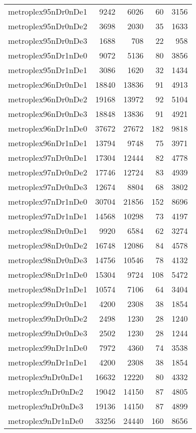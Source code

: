\begin{tabular}{lrrrr}
metroplex95nDr0nDe1 & 9242 & 6026 & 60 & 3156 \\
metroplex95nDr0nDe2 & 3698 & 2030 & 35 & 1633 \\
metroplex95nDr0nDe3 & 1688 & 708 & 22 & 958 \\
metroplex95nDr1nDe0 & 9072 & 5136 & 80 & 3856 \\
metroplex95nDr1nDe1 & 3086 & 1620 & 32 & 1434 \\
metroplex96nDr0nDe1 & 18840 & 13836 & 91 & 4913 \\
metroplex96nDr0nDe2 & 19168 & 13972 & 92 & 5104 \\
metroplex96nDr0nDe3 & 18848 & 13836 & 91 & 4921 \\
metroplex96nDr1nDe0 & 37672 & 27672 & 182 & 9818 \\
metroplex96nDr1nDe1 & 13794 & 9748 & 75 & 3971 \\
metroplex97nDr0nDe1 & 17304 & 12444 & 82 & 4778 \\
metroplex97nDr0nDe2 & 17746 & 12724 & 83 & 4939 \\
metroplex97nDr0nDe3 & 12674 & 8804 & 68 & 3802 \\
metroplex97nDr1nDe0 & 30704 & 21856 & 152 & 8696 \\
metroplex97nDr1nDe1 & 14568 & 10298 & 73 & 4197 \\
metroplex98nDr0nDe1 & 9920 & 6584 & 62 & 3274 \\
metroplex98nDr0nDe2 & 16748 & 12086 & 84 & 4578 \\
metroplex98nDr0nDe3 & 14756 & 10546 & 78 & 4132 \\
metroplex98nDr1nDe0 & 15304 & 9724 & 108 & 5472 \\
metroplex98nDr1nDe1 & 10574 & 7106 & 64 & 3404 \\
metroplex99nDr0nDe1 & 4200 & 2308 & 38 & 1854 \\
metroplex99nDr0nDe2 & 2498 & 1230 & 28 & 1240 \\
metroplex99nDr0nDe3 & 2502 & 1230 & 28 & 1244 \\
metroplex99nDr1nDe0 & 7972 & 4360 & 74 & 3538 \\
metroplex99nDr1nDe1 & 4200 & 2308 & 38 & 1854 \\
metroplex9nDr0nDe1 & 16632 & 12220 & 80 & 4332 \\
metroplex9nDr0nDe2 & 19042 & 14150 & 87 & 4805 \\
metroplex9nDr0nDe3 & 19136 & 14150 & 87 & 4899 \\
metroplex9nDr1nDe0 & 33256 & 24440 & 160 & 8656 \\

\end{tabular}
